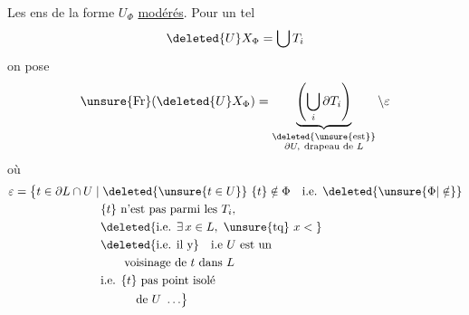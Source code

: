 Les ens de la forme $U_{\Phi}$  \uline{modérés}. Pour un tel
\[
\deleted{U}X_{\Phi}=\bigcup T_i
\]
on pose
\[
\unsure{\operatorname{Fr}}(\deleted{U}X_{\Phi})=
\underbrace{\left(\bigcup_i\partial T_i\right)}_{\substack{\deleted{\text{\unsure{est}}}\\\partial U,\ \text{drapeau de } L}}\setminus\varepsilon
\]
où
\[
\begin{aligned}
\varepsilon={}&\bigl\{t\in\partial L\cap U\mid
  \deleted{\unsure{t\in U}}\ \{t\}\notin\Phi\quad\text{i.e. }\deleted{\unsure{\Phi|\notin}}\\
&\hspace{6em}\{t\}\text{ n'est pas parmi les }T_i,\\
&\hspace{6em}\deleted{\text{i.e. }\exists\,x\in L,\ \text{\unsure{tq} } x<{}}\\
&\hspace{6em}\deleted{\text{i.e. il y}}\quad\text{i.e }U\text{ est un}\\
&\hspace{8em}\text{voisinage de }t\text{ dans } L\\
&\hspace{6em}\text{i.e. }\{t\}\text{ pas point isolé}\\
&\hspace{9em}\text{de }U\ \ldots\bigr\}
\end{aligned}
\]

